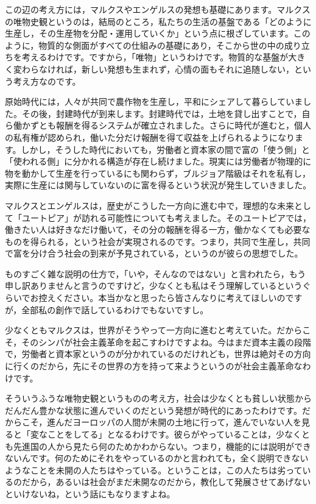 \documentclass{ltjsbook}
\begin{document}
この辺の考え方には，マルクスやエンゲルスの発想も基礎にあります。マルクスの唯物史観というのは，結局のところ，私たちの生活の基盤である「どのように生産し，その生産物を分配・運用していくか」という点に根ざしています。このように，物質的な側面がすべての仕組みの基礎にあり，そこから世の中の成り立ちを考えるわけです。ですから，「唯物」というわけです。物質的な基盤が大きく変わらなければ，新しい発想も生まれず，心情の面もそれに追随しない，という考え方なのです。

原始時代には，人々が共同で農作物を生産し，平和にシェアして暮らしていました。その後，封建時代が到来します。封建時代では，土地を貸し出すことで，自ら働かずとも報酬を得るシステムが確立されました。さらに時代が進むと，個人の私有権が認められ，働いた分だけ報酬を得て収益を上げられるようになります。しかし，そうした時代においても，労働者と資本家の間で富の「使う側」と「使われる側」に分かれる構造が存在し続けました。現実には労働者が物理的に物を動かして生産を行っているにも関わらず，ブルジョア階級はそれを私有し，実際に生産には関与していないのに富を得るという状況が発生していきました。

マルクスとエンゲルスは，歴史がこうした一方向に進む中で，理想的な未来として「ユートピア」が訪れる可能性についても考えました。そのユートピアでは，働きたい人は好きなだけ働いて，その分の報酬を得る一方，働かなくても必要なものを得られる，という社会が実現されるのです。つまり，共同で生産し，共同で富を分け合う社会の到来が予見されている，というのが彼らの思想でした。

ものすごく雑な説明の仕方で，「いや，そんなのではない」と言われたら，もう申し訳ありませんと言うのですけど，少なくとも私はそう理解しているというぐらいでお控えください。本当かなと思ったら皆さんなりに考えてほしいのですが，全部私の創作で話しているわけでもないですし。

少なくともマルクスは，世界がそうやって一方向に進むと考えていた。だからこそ，そのシンパが社会主義革命を起こすわけですよね。今はまだ資本主義の段階で，労働者と資本家というのが分かれているのだけれども，世界は絶対その方向に行くのだから，先にその世界の方を持って来ようというのが社会主義革命なわけです。

そういうふうな唯物史観というものの考え方，社会は少なくとも貧しい状態からだんだん豊かな状態に進んでいくのだという発想が時代的にあったわけです。だからこそ，進んだヨーロッパの人間が未開の土地に行って，進んでいない人を見ると「変なことをしてる」となるわけです。彼らがやっていることは，少なくとも先進国の人から見たら何のためかわからない。つまり，機能的には説明ができないんです。何のためにそれをやっているのかと言われても，全く説明できないようなことを未開の人たちはやっている。ということは，この人たちは劣っているのだから，あるいは社会がまだ未開なのだから，教化して発展させてあげないといけないね，という話にもなりますよね。
\end{document}
